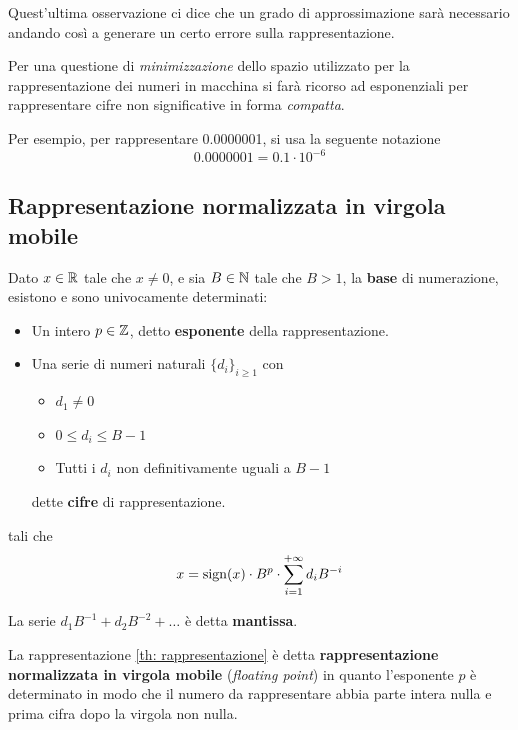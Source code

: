 Quest'ultima osservazione ci dice che un grado di approssimazione sarà necessario andando così a generare un
certo errore sulla rappresentazione.

Per una questione di \emph{minimizzazione} dello spazio utilizzato per la rappresentazione dei numeri in
macchina si farà ricorso ad esponenziali per rappresentare cifre non significative in forma \emph{compatta}.

\begin{example}
	Per esempio, per rappresentare 0.0000001, si usa la seguente notazione
	\[ 0.0000001 = 0.1 \cdot 10^{-6} \]
\end{example}

\subsection{Rappresentazione normalizzata in virgola mobile}

\begin{theorem}[Rappresentazione]\label{th: rappresentazione}
	Dato $x \in \mathbb{R}$ tale che $x \neq 0$, e sia $B \in \mathbb{N}$ tale che $B > 1$, la \textbf{base} di numerazione,
	esistono e sono univocamente determinati:
	\begin{itemize}
		\item Un intero $p \in \mathbb{Z}$, detto \textbf{esponente} della rappresentazione.
		\item Una serie di numeri naturali $\{ d_i \}_{i \geq 1}$ con
		      \begin{itemize}
			      \item $d_1 \neq 0$
			      \item $0 \leq d_i \leq B - 1$
			      \item Tutti i $d_i$ non definitivamente uguali a $B - 1$
		      \end{itemize}
		      dette \textbf{cifre} di rappresentazione.
	\end{itemize}
	tali che
	\[ x = \operatorname{sign}(x) \cdot B^p \cdot \sum_{i=1}^{+\infty} d_i B^{-i} \]
\end{theorem}

\begin{definition}
	La serie $d_1 B^{-1} + d_2 B^{-2} + \dots$ è detta \textbf{mantissa}.
\end{definition}

La rappresentazione \ref{th: rappresentazione} è detta \textbf{rappresentazione normalizzata in virgola mobile}
(\emph{floating point}) in quanto l'esponente $p$ è determinato in modo che il numero da rappresentare abbia
parte intera nulla e prima cifra dopo la virgola non nulla.

